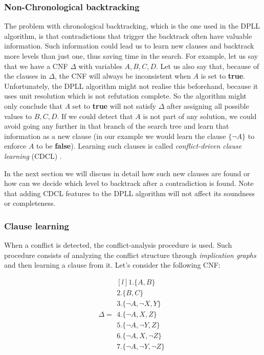 \documentclass[12pt]{diicc}
\begin{document}
\subsubsection{Non-Chronological backtracking}

The problem with chronological backtracking, which is the one used in the DPLL algorithm, is that contradictions that trigger the backtrack often have valuable information. Such information could lead us to learn new clauses and backtrack more levels than just one, thus saving time in the search. For example, let us say that we have a CNF $\Delta$ with variables $A,B,C,D$. Let us also say that, because of the clauses in $\Delta$, the CNF will always be inconsistent when $A$ is set to \textbf{true}. Unfortunately, the DPLL algorithm might not realise this beforehand, because it uses unit resolution which is not refutation complete. So the algorithm might only conclude that $A$ set to \textbf{true} will not satisfy $\Delta$ after assigning all possible values to $B,C,D$. If we could detect that $A$ is not part of any solution, we could avoid going any further in that branch of the search tree and learn that information as a new clause (in our example we would learn the clause $\{\neg A\}$ to enforce $A$ to be \textbf{false}). Learning such clauses is called \textit{conflict-driven clause learning} (CDCL) \cite{cdcl1,cdcl2}.

In the next section we will discuss in detail how such new clauses are found or how can we decide which level to backtrack after a contradiction is found. Note that adding CDCL features to the DPLL algorithm will not affect its soundness or completeness.

\subsubsection{Clause learning}

When a conflict is detected, the conflict-analysis procedure is used. Such procedure consists of analyzing the conflict structure through \textit{implication graphs} and then learning a clause from it. Let's consider the following CNF:

\begin{equation}\label{row sum}
\Delta = \begin{matrix*}[l]
			1.\{A,B\}\\
		 	2.\{B,C\}\\
		 	3.\{\neg A,\neg X,Y\}\\
		 	4.\{\neg A,X,Z\}\\
		 	5.\{\neg A,\neg Y,Z\}\\
		 	6.\{\neg A,X,\neg Z\}\\
		 	7.\{\neg A,\neg Y,\neg Z\}
		 \end{matrix*}
\end{equation}
\end{document}
